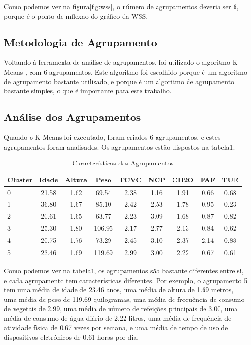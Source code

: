 \documentclass{easychair}
\begin{document}
Como podemos ver na figura\ref{fig:wss}, o número de agrupamentos deveria ser 6, porque é o ponto de inflexão do gráfico da WSS.

\subsection{Metodologia de Agrupamento}

Voltando à ferramenta de análise de agrupamentos, foi utilizado o algoritmo K-Means \cite{kmeans}, com 6 agrupamentos. Este algoritmo foi escolhido porque é um algoritmo de agrupamento bastante utilizado, e porque é um algoritmo de agrupamento bastante simples, o que é importante para este trabalho.

\subsection{Análise dos Agrupamentos}

Quando o K-Means \cite{kmeans} foi executado, foram criados 6 agrupamentos, e estes agrupamentos foram analisados. Os agrupamentos estão dispostos na tabela\ref{tab:clusters}.

\begin{table}[hbt!]
  \centering
  \begin{tabular}{l c c c c c c c c}
  \toprule
  Cluster & Idade   & Altura     & Peso       & FCVC     & NCP     & CH2O     & FAF     & TUE  \\
  \midrule
  0       & 21.58   & 1.62       & 69.54      & 2.38     & 1.16    & 1.91     & 0.66    & 0.68 \\
  1       & 36.80   & 1.67       & 85.10      & 2.42     & 2.53    & 1.78     & 0.95    & 0.23 \\
  2       & 20.61   & 1.65       & 63.77      & 2.23     & 3.09    & 1.68     & 0.87    & 0.82 \\
  3       & 25.30   & 1.80       & 106.95     & 2.17     & 2.77    & 2.13     & 0.84    & 0.62 \\
  4       & 20.75   & 1.76       & 73.29      & 2.45     & 3.10    & 2.37     & 2.14    & 0.88 \\
  5       & 23.46   & 1.69       & 119.69     & 2.99     & 3.00    & 2.22     & 0.67    & 0.61 \\
  \bottomrule
  \end{tabular}
  \caption{Características dos Agrupamentos}
  \label{tab:clusters}
\end{table}

Como podemos ver na tabela\ref{tab:clusters}, os agrupamentos são bastante diferentes entre si, e cada agrupamento tem características diferentes. Por exemplo, o agrupamento 5 tem uma média de idade de 23.46 anos, uma média de altura de 1.69 metros, uma média de peso de 119.69 quilogramas, uma média de frequência de consumo de vegetais de 2.99, uma média de número de refeições principais de 3.00, uma média de consumo de água diário de 2.22 litros, uma média de frequência de atividade física de 0.67 vezes por semana, e uma média de tempo de uso de dispositivos eletrónicos de 0.61 horas por dia.
\end{document}

